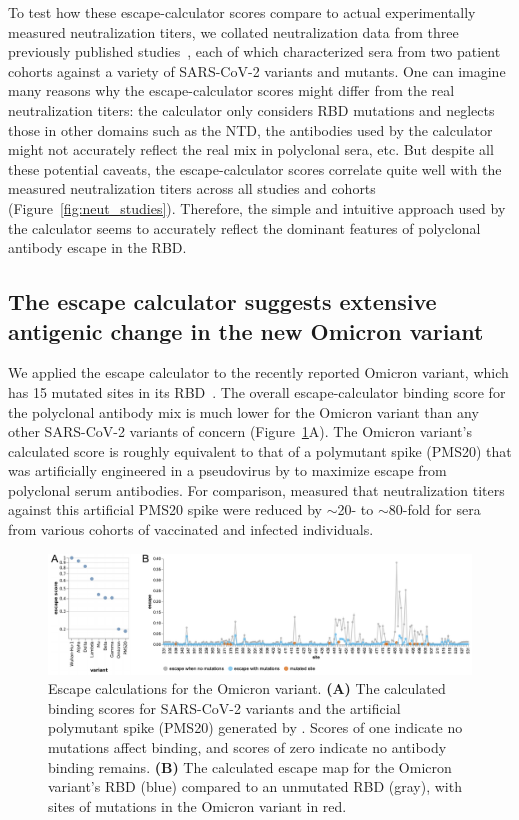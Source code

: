\documentclass[9pt,twocolumn,twoside]{gsajnl_modified}
\begin{document}
To test how these escape-calculator scores compare to actual experimentally measured neutralization titers, we collated neutralization data from three previously published studies~\citep{lucas2021impact,uriu2021neutralization,wang2021antibody}, each of which characterized sera from two patient cohorts against a variety of SARS-CoV-2 variants and mutants.
One can imagine many reasons why the escape-calculator scores might differ from the real neutralization titers: the calculator only considers RBD mutations and neglects those in other domains such as the NTD, the antibodies used by the calculator might not accurately reflect the real mix in polyclonal sera, etc.
But despite all these potential caveats, the escape-calculator scores correlate quite well with the measured neutralization titers across all studies and cohorts (Figure~\ref{fig:neut_studies}).
Therefore, the simple and intuitive approach used by the calculator seems to accurately reflect the dominant features of polyclonal antibody escape in the RBD.

\subsection{The escape calculator suggests extensive antigenic change in the new Omicron variant}
We applied the escape calculator to the recently reported Omicron variant, which has 15 mutated sites in its RBD~\citep{?}.
The overall escape-calculator binding score for the polyclonal antibody mix is much lower for the Omicron variant than any other SARS-CoV-2 variants of concern (Figure~\ref{fig:Omicron}A).
The Omicron variant's calculated score is roughly equivalent to that of a polymutant spike (PMS20) that was artificially engineered in a pseudovirus by \citet{schmidt2021high} to maximize escape from polyclonal serum antibodies.
For comparison, \citet{schmidt2021high} measured that neutralization titers against this artificial PMS20 spike were reduced by $\sim$20- to $\sim$80-fold for sera from various cohorts of vaccinated and infected individuals.

\begin{figure}
\includegraphics[width=\linewidth]{figures/Omicron/Omicron.pdf}
\caption{Escape calculations for the Omicron variant.
{\bf (A)} The calculated binding scores for SARS-CoV-2 variants and the artificial polymutant spike (PMS20) generated by \citet{schmidt2021high}.
Scores of one indicate no mutations affect binding, and scores of zero indicate no antibody binding remains.
{\bf (B)} The calculated escape map for the Omicron variant's RBD (blue) compared to an unmutated RBD (gray), with sites of mutations in the Omicron variant in red.
}
\label{fig:Omicron}
\end{figure}
\end{document}
